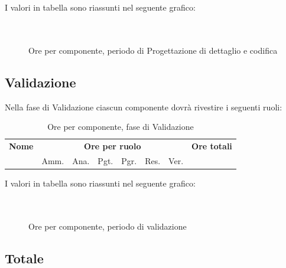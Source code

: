 I valori in tabella sono riassunti nel seguente grafico: \\ \\ \\

\begin{figure}[H]
\caption{Ore per componente, periodo di Progettazione di dettaglio e codifica}
\end{figure}
\pagebreak
\subsection{Validazione}

Nella fase di Validazione ciascun componente dovrà rivestire i seguenti ruoli:

\begin{table}[H]
\centering
\begin{tabular}{lccccccc}
\toprule 
    \textbf{Nome}  & \multicolumn{6}{c}{\textbf{Ore per ruolo}} & \textbf{Ore totali}\\
    & Amm. & Ana. & Pgt. & Pgr. & Res. & Ver. \\
    \midrule

        

    \bottomrule
\end{tabular}
\caption{Ore per componente, fase di Validazione}
\end{table}

I valori in tabella sono riassunti nel seguente grafico: \\ \\ \\
\begin{figure}[H]
\caption{Ore per componente, periodo di validazione}
\end{figure}

\pagebreak
\subsection{Totale}

